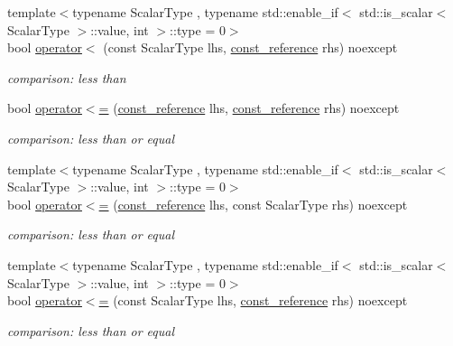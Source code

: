 \begin{DoxyCompactItemize}
{\footnotesize template$<$typename Scalar\+Type , typename std\+::enable\+\_\+if$<$ std\+::is\+\_\+scalar$<$ Scalar\+Type $>$\+::value, int $>$\+::type  = 0$>$ }\\bool \hyperlink{classnlohmann_1_1basic__json_abed3e9b4ab75f5bcbd3cd20f5af5cdab}{operator$<$} (const Scalar\+Type lhs, \hyperlink{classnlohmann_1_1basic__json_ab8a1c33ee7b154fc41ca2545aa9724e6}{const\+\_\+reference} rhs) noexcept
\begin{DoxyCompactList}\small\item\em comparison\+: less than \end{DoxyCompactList}\item 
bool \hyperlink{classnlohmann_1_1basic__json_a5c8bb5200f5eac10d31e26be46e5b1ac}{operator$<$=} (\hyperlink{classnlohmann_1_1basic__json_ab8a1c33ee7b154fc41ca2545aa9724e6}{const\+\_\+reference} lhs, \hyperlink{classnlohmann_1_1basic__json_ab8a1c33ee7b154fc41ca2545aa9724e6}{const\+\_\+reference} rhs) noexcept
\begin{DoxyCompactList}\small\item\em comparison\+: less than or equal \end{DoxyCompactList}\item 
{\footnotesize template$<$typename Scalar\+Type , typename std\+::enable\+\_\+if$<$ std\+::is\+\_\+scalar$<$ Scalar\+Type $>$\+::value, int $>$\+::type  = 0$>$ }\\bool \hyperlink{classnlohmann_1_1basic__json_a7e368211047f725f333696aefdf39ffd}{operator$<$=} (\hyperlink{classnlohmann_1_1basic__json_ab8a1c33ee7b154fc41ca2545aa9724e6}{const\+\_\+reference} lhs, const Scalar\+Type rhs) noexcept
\begin{DoxyCompactList}\small\item\em comparison\+: less than or equal \end{DoxyCompactList}\item 
{\footnotesize template$<$typename Scalar\+Type , typename std\+::enable\+\_\+if$<$ std\+::is\+\_\+scalar$<$ Scalar\+Type $>$\+::value, int $>$\+::type  = 0$>$ }\\bool \hyperlink{classnlohmann_1_1basic__json_ad73f88f70fe5acfa521750a8cd710026}{operator$<$=} (const Scalar\+Type lhs, \hyperlink{classnlohmann_1_1basic__json_ab8a1c33ee7b154fc41ca2545aa9724e6}{const\+\_\+reference} rhs) noexcept
\begin{DoxyCompactList}\small\item\em comparison\+: less than or equal \end{DoxyCompactList}\item 

\end{DoxyCompactItemize}
